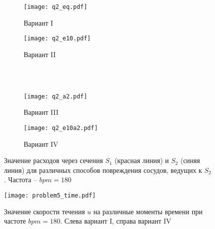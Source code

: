 \begin{figure}[h!]
\begin{subfigure}{0.5\linewidth}\centering
\texttt{[image: q2\_eq.pdf]}
\caption{Вариант I}\label{fig:prob5_q2_eq}
\end{subfigure}%
\begin{subfigure}{0.5\linewidth}\centering
\texttt{[image: q2\_e10.pdf]}
\caption{Вариант II}\label{fig:prob5_q2_e10}
\end{subfigure} \\
\hfill \\
\begin{subfigure}{0.5\linewidth}\centering
\texttt{[image: q2\_a2.pdf]}
\caption{Вариант III}\label{fig:prob5_q2_a2}
\end{subfigure}%
\begin{subfigure}{0.5\linewidth}\centering
\texttt{[image: q2\_e10a2.pdf]}
\caption{Вариант IV}\label{fig:prob5_a2_e10a2}
\end{subfigure}%
\caption{Значение расходов через сечения $S_1$ (красная линия) и $S_2$ (синяя линия) для различных способов повреждения сосудов, ведущих к $S_2$. Частота -- $bpm=180$}
\label{fig:prob5_q2}
\end{figure}

\begin{figure}[h!]
\centering
\texttt{[image: problem5\_time.pdf]}
\caption{Значение скорости течения $u$ на различные моменты времени при частоте $bpm=180$. Слева вариант I, справа вариант IV}\label{fig:prob5_time}

\end{figure}
